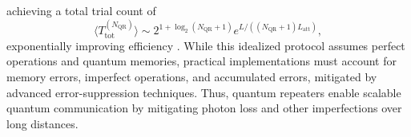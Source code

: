  achieving a total trial count of
 \begin{equation}
    \langle T^{(N_{\text{QR}})}_{\text{tot}} \rangle \sim 2^{1+\log_2(N_{\text{QR}} + 1)} e^{L/((N_{\text{QR}} + 1)L_{\text{att}})},
 \end{equation}
 exponentially improving efficiency \cite{Azuma:2023}. While this idealized protocol assumes perfect operations and quantum memories, practical implementations must account for memory errors,
 imperfect operations, and accumulated errors, mitigated by advanced error-suppression techniques. Thus,
 quantum repeaters enable scalable quantum communication by mitigating photon loss and other imperfections over long distances.


